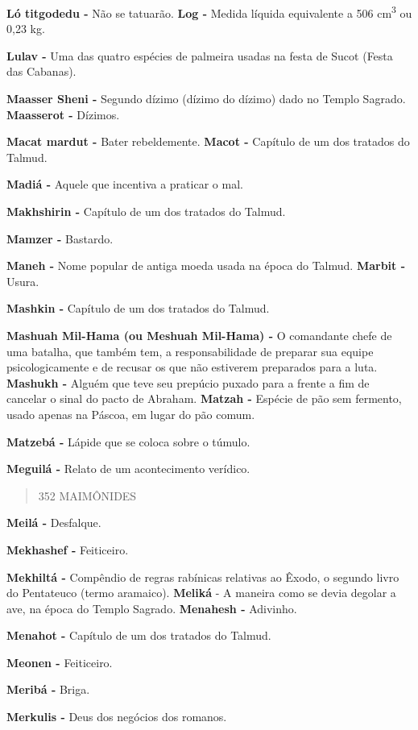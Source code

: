 \textbf{Ló titgodedu -} Não se tatuarão. \textbf{Log -} Medida líquida
equivalente a 506 cm\textsuperscript{3} ou 0,23 kg.

\textbf{Lulav -} Uma das quatro espécies de palmeira usadas na festa de
Sucot (Festa das Cabanas).

\textbf{Maasser Sheni -} Segundo dízimo (dízi­mo do dízimo) dado no
Templo Sagrado. \textbf{Maasserot -} Dízimos.

\textbf{Macat mardut -} Bater rebeldemente. \textbf{Macot -} Capítulo de
um dos tratados do Talmud.

\textbf{Madiá -} Aquele que incentiva a prati­car o mal.

\textbf{Makhshirin -} Capítulo de um dos tra­tados do Talmud.

\textbf{Mamzer -} Bastardo.

\textbf{Maneh -} Nome popular de antiga moe­da usada na época do Talmud.
\textbf{Marbit -} Usura.

\textbf{Mashkin -} Capítulo de um dos trata­dos do Talmud.

\textbf{Mashuah Mil-Hama (ou Meshuah Mil-Hama) -} O comandante chefe de
uma batalha, que também tem, a res­ponsabilidade de preparar sua equipe
psicologicamente e de recusar os que não estiverem preparados para a
luta. \textbf{Mashukh -} Alguém que teve seu pre­púcio puxado para a
frente a fim de cancelar o sinal do pacto de Abraham. \textbf{Matzah -}
Espécie de pão sem fermen­to, usado apenas na Páscoa, em lugar do pão
comum.

\textbf{Matzebá -} Lápide que se coloca sobre o túmulo.

\textbf{Meguilá -} Relato de um acontecimen­to verídico.

\begin{quote}
352 MAIMÔNIDES
\end{quote}

\textbf{Meilá -} Desfalque.

\textbf{Mekhashef -} Feiticeiro.

\textbf{Mekhiltá -} Compêndio de regras rabí­nicas relativas ao Êxodo, o
segundo li­vro do Pentateuco (termo aramaico). \textbf{Meliká} - A
maneira como se devia dego­lar a ave, na época do Templo Sagrado.
\textbf{Menahesh -} Adivinho.

\textbf{Menahot -} Capítulo de um dos trata­dos do Talmud.

\textbf{Meonen -} Feiticeiro.

\textbf{Meribá -} Briga.

\textbf{Merkulis -} Deus dos negócios dos ro­manos.

